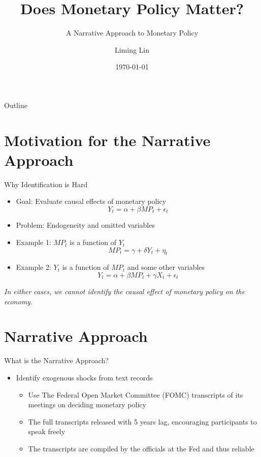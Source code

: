 \documentclass{beamer}
\title{Does Monetary Policy Matter?}
\subtitle{A Narrative Approach to Monetary Policy }
\author{Liming Lin}
\institute{Sciences Po}
\date{\today}
\begin{document}
\begin{frame}
  \titlepage
\end{frame}


\begin{frame}{Outline}
  \tableofcontents
\end{frame}

\section{Motivation for the Narrative Approach}

\begin{frame}{Why Identification is Hard}
  \begin{itemize}
    \item Goal: Evaluate causal effects of monetary policy
    \[
  Y_t = \alpha + \beta MP_t + \epsilon_t
  \]
    \item Problem: Endogeneity and omitted variables
    \item Example 1: $MP_t$ is a function of $Y_t$
    \[
    MP_t = \gamma + \delta Y_t + \eta_t
    \]
    \item Example 2: $Y_t$ is a function of $MP_t$ and some other variables
    \[
    Y_t = \alpha + \beta MP_t + \gamma X_t + \epsilon_t
    \]
  \end{itemize}
  
  \textit{In either cases, we cannot identify the causal effect of monetary policy on the economy.}
\end{frame}

\section{Narrative Approach}

\begin{frame}{What is the Narrative Approach?}
  \begin{itemize}
    \item Identify exogenous shocks from text records
    \begin{itemize}
    \item Use The Federal Open Market Committee (FOMC) transcripts of its meetings on deciding monetary policy
    \item The full transcripts released with 5 years lag, encouraging participants to speak freely
    \item The transcripts are compiled by the officials at the Fed and thus reliable
    \end{itemize}

  \end{itemize}
\end{frame}
\end{document}
